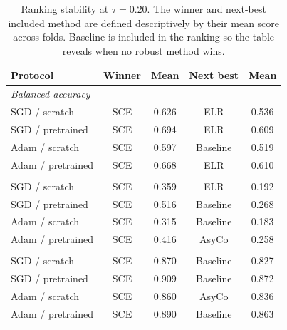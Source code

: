 
\begin{table}[htbp]
\centering
\caption{Ranking stability at $\tau=0.20$. The winner and next-best included method are defined descriptively by their mean score across folds. Baseline is included in the ranking so the table reveals when no robust method wins.}
\label{tab:protocol-ranking-focus}
\begin{tabular}{lcccc}
\toprule
Protocol & Winner & Mean & Next best & Mean \\
\midrule
\multicolumn{5}{l}{\textit{Balanced accuracy}} \\
SGD / scratch & SCE & 0.626 & ELR & 0.536 \\
SGD / pretrained & SCE & 0.694 & ELR & 0.609 \\
Adam / scratch & SCE & 0.597 & Baseline & 0.519 \\
Adam / pretrained & SCE & 0.668 & ELR & 0.610 \\
\addlinespace
\multicolumn{5}{l}{\textit{Macro F1}} \\
SGD / scratch & SCE & 0.359 & ELR & 0.192 \\
SGD / pretrained & SCE & 0.516 & Baseline & 0.268 \\
Adam / scratch & SCE & 0.315 & Baseline & 0.183 \\
Adam / pretrained & SCE & 0.416 & AsyCo & 0.258 \\
\addlinespace
\multicolumn{5}{l}{\textit{Macro AUC}} \\
SGD / scratch & SCE & 0.870 & Baseline & 0.827 \\
SGD / pretrained & SCE & 0.909 & Baseline & 0.872 \\
Adam / scratch & SCE & 0.860 & AsyCo & 0.836 \\
Adam / pretrained & SCE & 0.890 & Baseline & 0.863 \\
\bottomrule
\end{tabular}
\end{table}

